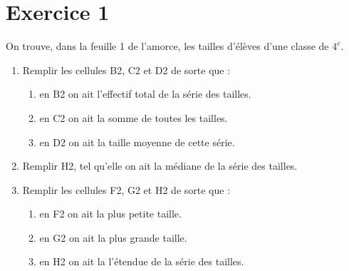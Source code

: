 \def\authors{PESIN - CADOT - COURTIN}
\def\date{(activité originale \href{http://rjorro.free.fr/vil9/4ieme/4e_DOCII4_TICEmoyennes.pdf}{Mme JORRO})}
\def\theme{Activité : Statistiques}
\def\imgPath{libre-office/}
\vspace*{-1cm}



\vspace*{-0.5cm}

\section*{Exercice 1}

On trouve,
dans la feuille 1 de l'amorce, les tailles d'élèves d'une classe de $4^e$.

\begin{enumerate}
    \item Remplir les cellules B2, C2 et D2 de sorte que : 
    \begin{enumerate}
        \item en B2 on ait l'effectif total de la série des tailles.
        \item en C2 on ait la somme de toutes les tailles.
        \item en D2 on ait la taille moyenne de cette série.
    \end{enumerate}
    \item Remplir H2, tel qu'elle on ait la médiane de la série des tailles.
    \item Remplir les cellules F2, G2 et H2 de sorte que : 
    \begin{enumerate}
        \item en F2 on ait la plus petite taille.
        \item en G2 on ait la plus grande taille.
        \item en H2 on ait la l'étendue de la série des tailles.
    \end{enumerate}
\end{enumerate}

